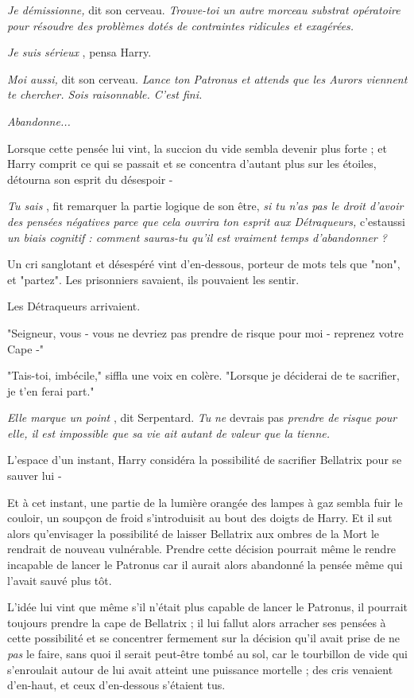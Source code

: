 \emph{Je démissionne,}  dit son cerveau. \emph{Trouve-toi un autre morceau substrat opératoire pour résoudre des problèmes dotés de contraintes ridicules et exagérées.} 

\emph{Je suis sérieux} , pensa Harry.

\emph{Moi aussi, } dit son cerveau. \emph{Lance ton Patronus et attends que les Aurors viennent te chercher. Sois raisonnable. C'est fini.} 

\emph{Abandonne...} 

Lorsque cette pensée lui vint, la succion du vide sembla devenir plus forte ; et Harry comprit ce qui se passait et se concentra d'autant plus sur les étoiles, détourna son esprit du désespoir -

\emph{Tu sais} , fit remarquer la partie logique de son être, \emph{si tu n'as pas le droit d'avoir des pensées négatives parce que cela ouvrira ton esprit aux Détraqueurs, } c'estaussi\emph{ un biais cognitif : comment sauras-tu qu'il est vraiment temps d'abandonner ?} 

Un cri sanglotant et désespéré vint d'en-dessous, porteur de mots tels que "non", et "partez". Les prisonniers savaient, ils pouvaient les sentir.

Les Détraqueurs arrivaient.

"Seigneur, vous - vous ne devriez pas prendre de risque pour moi - reprenez votre Cape -"

"Tais-toi, imbécile," siffla une voix en colère. "Lorsque je déciderai de te sacrifier, je t'en ferai part."

\emph{Elle marque un point} , dit Serpentard. \emph{Tu}  \emph{ne } devrais pas \emph{prendre de risque pour elle, il est impossible que sa vie ait autant de valeur que la tienne.} 

L'espace d'un instant, Harry considéra la possibilité de sacrifier Bellatrix pour se sauver lui -

Et à cet instant, une partie de la lumière orangée des lampes à gaz sembla fuir le couloir, un soupçon de froid s'introduisit au bout des doigts de Harry. Et il sut alors qu'envisager la possibilité de laisser Bellatrix aux ombres de la Mort le rendrait de nouveau vulnérable. Prendre cette décision pourrait même le rendre incapable de lancer le Patronus car il aurait alors abandonné la pensée même qui l'avait sauvé plus tôt.

L'idée lui vint que même s'il n'était plus capable de lancer le Patronus, il pourrait toujours prendre la cape de Bellatrix ; il lui fallut alors arracher ses pensées à cette possibilité et se concentrer fermement sur la décision qu'il avait prise de ne \emph{pas}  le faire, sans quoi il serait peut-être tombé au sol, car le tourbillon de vide qui s'enroulait autour de lui avait atteint une puissance mortelle ; des cris venaient d'en-haut, et ceux d'en-dessous s'étaient tus.

